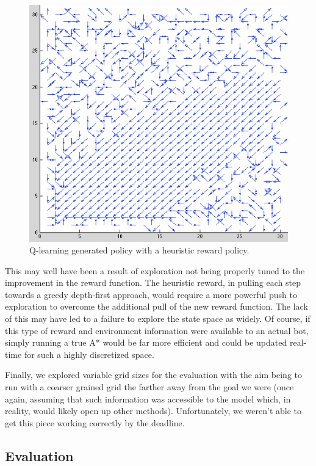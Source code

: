 \documentclass{aiaa-tc}%
\begin{document}
\begin{figure}[htbp]
  \centering
  \includegraphics[width=\linewidth]{images/HeuristicPolicy.png} 
  \caption{Q-learning generated policy with a heuristic reward policy.}
  \label{fig:heurQ}
\end{figure}
\clearpage

This may well have been a result of exploration
not being properly tuned to the improvement in the reward
function. The heuristic reward, in pulling each step towards a greedy
depth-first approach, would require a more powerful push to exploration
to overcome the additional pull of the new reward function. The lack
of this may have led to a failure to explore
the state space as widely. Of course, if this type
of reward and environment information were available to an actual bot,
simply
running a true A* would be far more
efficient and could be updated real-time for such a highly discretized
space.

Finally, we explored variable grid sizes for the evaluation with the
aim being to run with a coarser grained grid the farther away from the
goal we were (once again, assuming that such information was
accessible to the model which, in reality, would likely open up other
methods). Unfortunately, we weren't able to get this piece working
correctly by the deadline.

\subsection{Evaluation}
\end{document}
